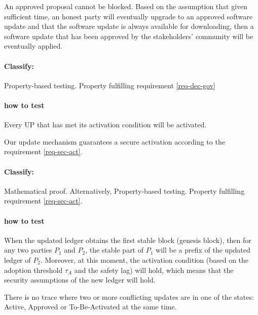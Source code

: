\begin{property}\label{prop:approved-sus}
  An approved proposal cannot be blocked. Based on the assumption that given
  sufficient time, an honest party will eventually upgrade to an approved
  software update and that the software update is always available for
  downloading, then a software update that has been approved by the
  stakeholders' community will be eventually applied.
\end{property}

\paragraph{Classify:} Property-based testing. Property fulfilling requirement
\ref{req-dec-gov}

\paragraph{how to test}
Every UP that has met its activation condition will be activated.

\begin{property}\label{prop:updated-ledger-security}
  Our update mechanism guarantees a secure activation according to the
  requirement \ref{req-sec-act}.
\end{property}

\paragraph{Classify:}
Mathematical proof. Alternatively, Property-based testing. Property fulfilling
requirement \ref{req-sec-act}.

\paragraph{how to test}
When the updated ledger obtains the first stable block (genesis block), then for
any two parties $P_1$ and $P_2$, the stable part of $P_1$ will be a prefix of
the updated ledger of $P_2$. Moreover, at this moment, the activation condition
(based on the adoption threshold $\tau_A$ and the safety lag) will hold, which
means that the security assumptions of the new ledger will hold.

\begin{property}\label{prop:conflict-res}
  There is no trace where two or more conflicting updates are in one of the
  states: Active, Approved or To-Be-Activated at the same time.
\end{property}

